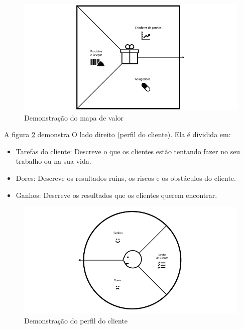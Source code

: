 \begin{figure}[htbp!] \begin{center}
\includegraphics[width=1\linewidth]{./figuras/Mapa-de-Valor-Canvas-de-Proposta-de-Valor}
\caption{Demonstração do mapa de valor}
\label{Fig:mapa-valor-canvas}
\end{center} 
\end{figure}

A figura \ref{Fig:perfil-cliente-canvas} demonstra O lado direito (perfil do cliente). Ela é dividida em: 
\begin{itemize}
    \item Tarefas do cliente: Descreve o que os clientes estão tentando fazer no seu trabalho ou na sua vida.
    \item Dores: Descreve os resultados ruins, os riscos e os obstáculos do cliente.
    \item Ganhos: Descreve os resultados que os clientes querem encontrar.
\end{itemize}

\begin{figure}[htbp!] \begin{center}
\includegraphics[width=1\linewidth]{./figuras/Perfil-do-Clientes-Canvas-de-Proposta-de-Valor}
\caption{Demonstração do perfil do cliente}
\label{Fig:perfil-cliente-canvas}
\end{center} 
\end{figure}


